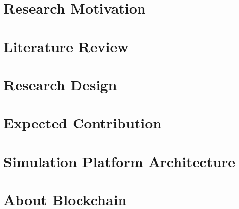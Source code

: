 \documentclass[a4paper]{article}
\begin{document}
	


\tableofcontents
\clearpage
\listoffigures
\clearpage


\section{Research Motivation}
\label{sec:research_motivation}

\clearpage

\section{Literature Review}
\label{sec:literature_review}

\clearpage

\section{Research Design}
\label{sec:research_design}


\section{Expected Contribution}
\label{sec:expected_contribution}

\clearpage

\section{Simulation Platform Architecture}
\label{sec:Simulation Platform Architecture}

\clearpage

\section{About Blockchain}
\label{sec:about_blockchain}


\clearpage
\printbibliography
\end{document}
